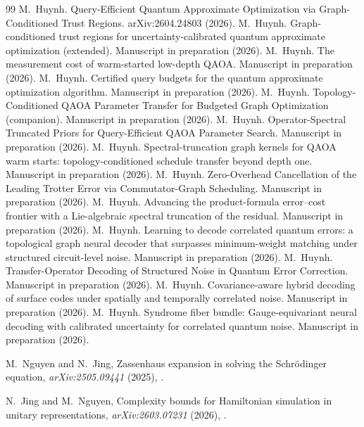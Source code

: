 \documentclass[twocolumn,aps,prxquantum,superscriptaddress,nofootinbib,floatfix,longbibliography]{revtex4-2}
\begin{document}
\begin{thebibliography}{99}
 M.~Huynh. Query-Efficient Quantum Approximate Optimization via Graph-Conditioned Trust Regions. arXiv:2604.24803 (2026).
 M.~Huynh. Graph-conditioned trust regions for uncertainty-calibrated quantum approximate optimization (extended). Manuscript in preparation (2026).
 M.~Huynh. The measurement cost of warm-started low-depth QAOA. Manuscript in preparation (2026).
 M.~Huynh. Certified query budgets for the quantum approximate optimization algorithm. Manuscript in preparation (2026).
 M.~Huynh. Topology-Conditioned QAOA Parameter Transfer for Budgeted Graph Optimization (companion). Manuscript in preparation (2026).
 M.~Huynh. Operator-Spectral Truncated Priors for Query-Efficient QAOA Parameter Search. Manuscript in preparation (2026).
 M.~Huynh. Spectral-truncation graph kernels for QAOA warm starts: topology-conditioned schedule transfer beyond depth one. Manuscript in preparation (2026).
 M.~Huynh. Zero-Overhead Cancellation of the Leading Trotter Error via Commutator-Graph Scheduling. Manuscript in preparation (2026).
 M.~Huynh. Advancing the product-formula error--cost frontier with a Lie-algebraic spectral truncation of the residual. Manuscript in preparation (2026).
 M.~Huynh. Learning to decode correlated quantum errors: a topological graph neural decoder that surpasses minimum-weight matching under structured circuit-level noise. Manuscript in preparation (2026).
 M.~Huynh. Transfer-Operator Decoding of Structured Noise in Quantum Error Correction. Manuscript in preparation (2026).
 M.~Huynh. Covariance-aware hybrid decoding of surface codes under spatially and temporally correlated noise. Manuscript in preparation (2026).
 M.~Huynh. Syndrome fiber bundle: Gauge-equivariant neural decoding with calibrated uncertainty for correlated quantum noise. Manuscript in preparation (2026).

M.~Nguyen and N.~Jing, Zassenhaus expansion in solving the Schr\"odinger equation, \emph{arXiv:2505.09441} (2025), .

N.~Jing and M.~Nguyen, Complexity bounds for Hamiltonian simulation in unitary representations, \emph{arXiv:2603.07231} (2026), .

\end{thebibliography}
\end{document}
